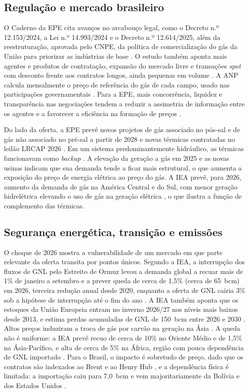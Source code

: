 \subsection{Regulação e mercado brasileiro}
O Caderno da EPE cita avanços no arcabouço legal, como o Decreto n.º 12.153/2024, a Lei n.º 14.993/2024 e o Decreto n.º 12.614/2025, além da reestruturação, aprovada pelo CNPE, da política de comercialização do gás da União para priorizar as indústrias de base \cite{epe2026gas}. O estudo também aponta mais agentes e produtos de contratação, expansão do mercado livre e transações \emph{spot} com desconto frente aos contratos longos, ainda pequenas em volume \cite{epe2026gas}. A ANP calcula mensalmente o preço de referência do gás de cada campo, usado nas participações governamentais \cite{anp2026}. Para a EPE, mais concorrência, liquidez e transparência nas negociações tendem a reduzir a assimetria de informação entre os agentes e a favorecer a eficiência na formação de preços \cite{epe2026gas}.

Do lado da oferta, a EPE prevê novos projetos de gás associado no pós-sal e de gás não associado no pré-sal a partir de 2028 e novas térmicas contratadas no leilão LRCAP 2026 \cite{epe2026gas}. Em um sistema predominantemente hidráulico, as térmicas funcionavam como \emph{backup} \cite{pinto2007}. A elevação da geração a gás em 2025 \cite{ben2026} e as novas usinas indicam que sua demanda tende a ficar mais estrutural, o que aumenta a exposição do preço de energia elétrica ao preço do gás. A IEA prevê, para 2026, aumento da demanda de gás na América Central e do Sul, com menor geração hidrelétrica elevando o uso de gás na geração elétrica \cite{iea2026gas}, o que ilustra a função de complemento das térmicas.

\subsection{Segurança energética, transição e emissões}
O choque de 2026 mostra a vulnerabilidade de um mercado em que parte relevante da oferta transita por pontos únicos. Segundo a IEA, a interrupção dos fluxos de GNL pelo Estreito de Ormuz levou a demanda global a recuar mais de 1\% de janeiro a setembro e a prever queda de cerca de 1,5\% (cerca de 65~bcm) em 2026, terceira redução anual desde 2020, enquanto a oferta de GNL cairia 3\% sob a hipótese de interrupção até o fim do ano \cite{iea2026gas}. A IEA também aponta que os estoques da União Europeia entram no inverno 2026/27 nos níveis mais baixos desde 2013, e estima perdas acumuladas de GNL de 150~bcm entre 2026 e 2030 \cite{iea2026gas}. Altos preços induziram a troca de gás por carvão na geração na Ásia \cite{iea2026gas}. A queda não é uniforme: a IEA prevê recuo de cerca de 10\% no Oriente Médio e de 1,5\% na Ásia-Pacífico, e alta de cerca de 5\% na África, região com pouca dependência de GNL importado \cite{iea2026gas}. Para o Brasil, o impacto é sobretudo de preço, dado que os contratos são indexados ao Brent e ao Henry Hub \cite{epe2026gas}, e a dependência física é limitada: a importação caiu para 7,0~bcm \cite{ei2026} e vem majoritariamente da Bolívia e dos Estados Unidos \cite{anp2026}.

